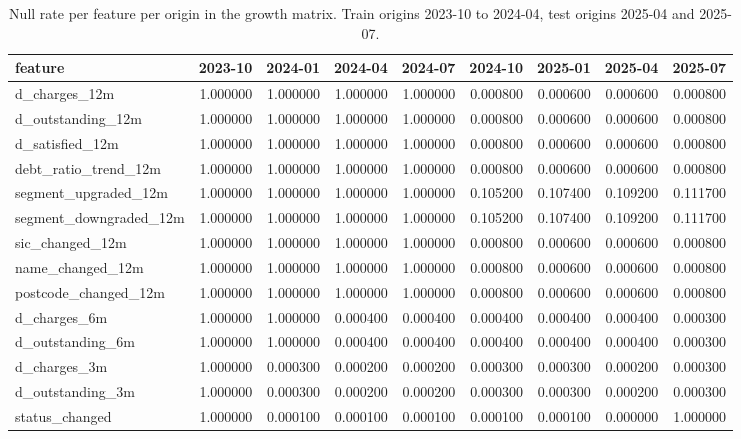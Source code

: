 \begin{table}
\caption{Null rate per feature per origin in the growth matrix. Train origins 2023-10 to 2024-04, test origins 2025-04 and 2025-07.}
\label{tab:growth_null_rates_by_origin}
\begin{tabular}{lrrrrrrrr}
\toprule
feature & 2023-10 & 2024-01 & 2024-04 & 2024-07 & 2024-10 & 2025-01 & 2025-04 & 2025-07 \\
\midrule
d_charges_12m & 1.000000 & 1.000000 & 1.000000 & 1.000000 & 0.000800 & 0.000600 & 0.000600 & 0.000800 \\
d_outstanding_12m & 1.000000 & 1.000000 & 1.000000 & 1.000000 & 0.000800 & 0.000600 & 0.000600 & 0.000800 \\
d_satisfied_12m & 1.000000 & 1.000000 & 1.000000 & 1.000000 & 0.000800 & 0.000600 & 0.000600 & 0.000800 \\
debt_ratio_trend_12m & 1.000000 & 1.000000 & 1.000000 & 1.000000 & 0.000800 & 0.000600 & 0.000600 & 0.000800 \\
segment_upgraded_12m & 1.000000 & 1.000000 & 1.000000 & 1.000000 & 0.105200 & 0.107400 & 0.109200 & 0.111700 \\
segment_downgraded_12m & 1.000000 & 1.000000 & 1.000000 & 1.000000 & 0.105200 & 0.107400 & 0.109200 & 0.111700 \\
sic_changed_12m & 1.000000 & 1.000000 & 1.000000 & 1.000000 & 0.000800 & 0.000600 & 0.000600 & 0.000800 \\
name_changed_12m & 1.000000 & 1.000000 & 1.000000 & 1.000000 & 0.000800 & 0.000600 & 0.000600 & 0.000800 \\
postcode_changed_12m & 1.000000 & 1.000000 & 1.000000 & 1.000000 & 0.000800 & 0.000600 & 0.000600 & 0.000800 \\
d_charges_6m & 1.000000 & 1.000000 & 0.000400 & 0.000400 & 0.000400 & 0.000400 & 0.000400 & 0.000300 \\
d_outstanding_6m & 1.000000 & 1.000000 & 0.000400 & 0.000400 & 0.000400 & 0.000400 & 0.000400 & 0.000300 \\
d_charges_3m & 1.000000 & 0.000300 & 0.000200 & 0.000200 & 0.000300 & 0.000300 & 0.000200 & 0.000300 \\
d_outstanding_3m & 1.000000 & 0.000300 & 0.000200 & 0.000200 & 0.000300 & 0.000300 & 0.000200 & 0.000300 \\
status_changed & 1.000000 & 0.000100 & 0.000100 & 0.000100 & 0.000100 & 0.000100 & 0.000000 & 1.000000 \\
\bottomrule
\end{tabular}
\end{table}
